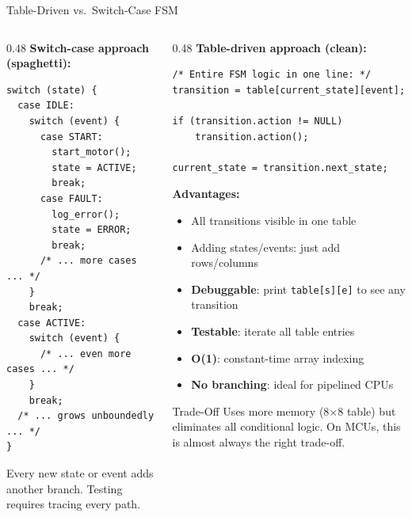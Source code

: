 \documentclass[aspectratio=169, 10pt]{beamer}
\begin{document}
\begin{frame}[fragile]{Table-Driven vs.\ Switch-Case FSM}
\begin{columns}[T]
\begin{column}{0.48\textwidth}
\textbf{Switch-case approach (spaghetti):}
\begin{lstlisting}[style=cstyle, basicstyle=\ttfamily\tiny,
  title={The problem: nested switch-case}]
switch (state) {
  case IDLE:
    switch (event) {
      case START:
        start_motor();
        state = ACTIVE;
        break;
      case FAULT:
        log_error();
        state = ERROR;
        break;
      /* ... more cases ... */
    }
    break;
  case ACTIVE:
    switch (event) {
      /* ... even more cases ... */
    }
    break;
  /* ... grows unboundedly ... */
}
\end{lstlisting}

Every new state or event adds another branch.
Testing requires tracing every path.
\end{column}

\begin{column}{0.48\textwidth}
\textbf{Table-driven approach (clean):}
\begin{lstlisting}[style=cstyle, basicstyle=\ttfamily\tiny,
  title={The solution: 2D table lookup}]
/* Entire FSM logic in one line: */
transition = table[current_state][event];

if (transition.action != NULL)
    transition.action();

current_state = transition.next_state;
\end{lstlisting}

\vspace{0.5em}
\textbf{Advantages:}
\begin{itemize}
  \item All transitions visible in one table
  \item Adding states/events: just add rows/columns
  \item \textbf{Debuggable}: print \texttt{table[s][e]} to see any transition
  \item \textbf{Testable}: iterate all table entries
  \item \textbf{O(1)}: constant-time array indexing
  \item \textbf{No branching}: ideal for pipelined CPUs
\end{itemize}

\vspace{0.3em}
\begin{block}{Trade-Off}
Uses more memory (8$\times$8 table) but eliminates
all conditional logic. On MCUs, this is almost always
the right trade-off.
\end{block}
\end{column}
\end{columns}
\end{frame}
\end{document}
